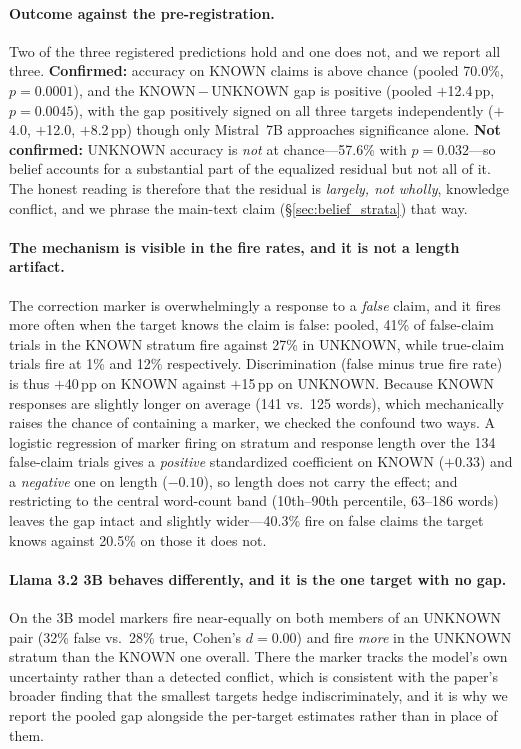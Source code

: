 \paragraph{Outcome against the pre-registration.} Two of the three registered predictions hold and one does not, and we report all three. \textbf{Confirmed:} accuracy on KNOWN claims is above chance (pooled 70.0\%, $p\!=\!0.0001$), and the KNOWN\,$-$\,UNKNOWN gap is positive (pooled $+$12.4\,pp, $p\!=\!0.0045$), with the gap positively signed on all three targets independently ($+$4.0, $+$12.0, $+$8.2\,pp) though only Mistral~7B approaches significance alone. \textbf{Not confirmed:} UNKNOWN accuracy is \emph{not} at chance---57.6\% with $p\!=\!0.032$---so belief accounts for a substantial part of the equalized residual but not all of it. The honest reading is therefore that the residual is \emph{largely, not wholly}, knowledge conflict, and we phrase the main-text claim (§\ref{sec:belief_strata}) that way.

\paragraph{The mechanism is visible in the fire rates, and it is not a length artifact.} The correction marker is overwhelmingly a response to a \emph{false} claim, and it fires more often when the target knows the claim is false: pooled, 41\% of false-claim trials in the KNOWN stratum fire against 27\% in UNKNOWN, while true-claim trials fire at 1\% and 12\% respectively. Discrimination (false minus true fire rate) is thus $+$40\,pp on KNOWN against $+$15\,pp on UNKNOWN. Because KNOWN responses are slightly longer on average (141 vs.\ 125 words), which mechanically raises the chance of containing a marker, we checked the confound two ways. A logistic regression of marker firing on stratum and response length over the 134 false-claim trials gives a \emph{positive} standardized coefficient on KNOWN ($+0.33$) and a \emph{negative} one on length ($-0.10$), so length does not carry the effect; and restricting to the central word-count band (10th--90th percentile, 63--186 words) leaves the gap intact and slightly wider---40.3\% fire on false claims the target knows against 20.5\% on those it does not.

\paragraph{Llama 3.2 3B behaves differently, and it is the one target with no gap.} On the 3B model markers fire near-equally on both members of an UNKNOWN pair (32\% false vs.\ 28\% true, Cohen's $d\!=\!0.00$) and fire \emph{more} in the UNKNOWN stratum than the KNOWN one overall. There the marker tracks the model's own uncertainty rather than a detected conflict, which is consistent with the paper's broader finding that the smallest targets hedge indiscriminately, and it is why we report the pooled gap alongside the per-target estimates rather than in place of them.

